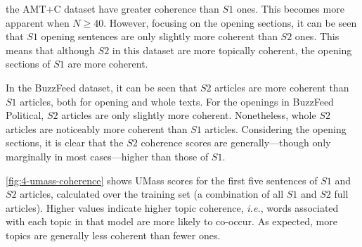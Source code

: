 %
 the AMT+C dataset have greater coherence than $S1$ ones. This becomes more apparent when $N \geq 40$. However, focusing on the opening sections, it can be seen that $S1$ opening sentences are only slightly more coherent than $S2$ ones. This means that although $S2$ in this dataset are more topically coherent, the opening sections of $S1$ are more coherent.

In the BuzzFeed dataset, it can be seen that $S2$ articles are more coherent than $S1$ articles, both for opening and whole texts. For the openings in BuzzFeed Political, $S2$ articles are only slightly more coherent. Nonetheless, whole $S2$ articles are noticeably more coherent than $S1$ articles. Considering the opening sections, it is clear that the $S2$ coherence scores are generally—though only marginally in most cases—higher than those of $S1$.

\autoref{fig:4-umass-coherence} shows UMass scores for the first five sentences of $S1$ and $S2$ articles, calculated over the training set (a combination of all $S1$ and $S2$ full articles). Higher values indicate higher topic coherence, \emph{i.e.}, words associated with each topic in that model are more likely to co-occur. As expected, more topics are generally less coherent than fewer ones.

